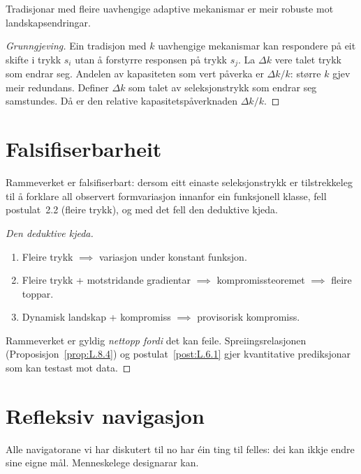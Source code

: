\begin{satmark}\label{thm:L.9.2}
Tradisjonar med fleire uavhengige adaptive mekanismar er meir
robuste mot landskapsendringar.
\end{satmark}

\begin{proof}[Grunngjeving]
Ein tradisjon med $k$ uavhengige mekanismar kan respondere på eit
skifte i trykk $s_i$ utan å forstyrre responsen på trykk $s_j$.
La $\Delta k$ vere talet trykk som endrar seg. Andelen av
kapasiteten som vert påverka er $\Delta k / k$: større $k$ gjev
meir redundans. Definer $\Delta k$ som talet av seleksjonstrykk
som endrar seg samstundes. Då er den relative
kapasitetspåverknaden $\Delta k / k$.
\end{proof}


\section{Falsifiserbarheit}

\begin{satmark}%
\label{thm:L.9.3}
Rammeverket er falsifiserbart: dersom eitt einaste
seleksjonstrykk er tilstrekkeleg til å forklare all
observert formvariasjon innanfor ein funksjonell klasse, fell
postulat~2.2 (fleire trykk), og med det fell den deduktive kjeda.
\end{satmark}

\begin{proof}[Den deduktive kjeda]
\begin{enumerate}[nosep]
  \item Fleire trykk $\implies$ variasjon under konstant funksjon.
  \item Fleire trykk + motstridande gradientar $\implies$
    kompromissteoremet $\implies$ fleire toppar.
  \item Dynamisk landskap + kompromiss $\implies$ provisorisk
    kompromiss.
\end{enumerate}
Rammeverket er gyldig \emph{nettopp fordi} det kan feile.
Spreiingsrelasjonen (Proposisjon~\ref{prop:L.8.4}) og
postulat~\ref{post:L.6.1} gjer kvantitative prediksjonar som
kan testast mot data.
\end{proof}


\section{Refleksiv navigasjon}

Alle navigatorane vi har diskutert til no har éin ting til felles:
dei kan ikkje endre sine eigne mål. Menneskelege designarar kan.


